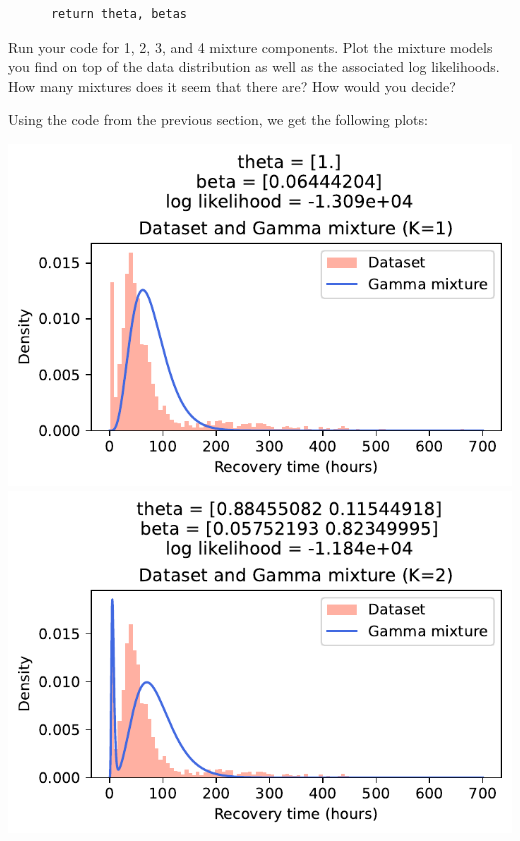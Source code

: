 \documentclass[expanded]{lkx_pset}
\begin{document}
\begin{parts}
\begin{verbatim}
      return theta, betas
	\end{verbatim}

	\begin{part}{3} Run your code for 1, 2, 3, and 4 mixture components.  Plot the
		mixture models you find on top of the data distribution as well as
		the associated log likelihoods.  How many mixtures does it seem that
		there are?  How would you decide?
	\end{part}

	Using the code from the previous section, we get the following plots:
	\begin{center}
		\includegraphics[scale=0.7]{figures/p2_3_1mixtures.pdf}
		\includegraphics[scale=0.7]{figures/p2_3_2mixtures.pdf}


\end{center}
\end{parts}
\end{document}

